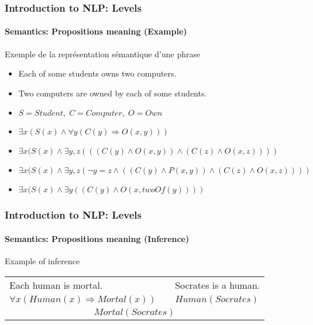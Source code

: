 \documentclass[xcolor=table]{beamer}
\begin{document}
\begin{frame}
\frametitle{Introduction to NLP: Levels}
\framesubtitle{Semantics: Propositions meaning (Example)}

\begin{exampleblock}{Exemple de la représentation sémantique d'une phrase}
	\begin{itemize}
		\item Each of some students owns two computers.
		\item Two computers are owned by each of some students.
		\item $S = Student, \; C = Computer, \; O = Own$
		\item $\exists x (S(x) \wedge \forall y ( C(y) \Rightarrow O(x, y)) )$ \textcolor{red}{\XBox}
		\item $\exists x (S(x) \wedge \exists y, z (( (C(y) \wedge O(x, y) ) \wedge (C(z) \wedge O(x, z) ) ))$ \textcolor{red}{\XBox}
		\item $\exists x (S(x) \wedge \exists y, z (\neg y = z \wedge ( (C(y) \wedge P(x, y) ) \wedge (C(z) \wedge O(x, z) ) ))$ \textcolor{green}{\CheckedBox}
		\item $\exists x (S(x) \wedge \exists y ((C(y) \wedge O(x, twoOf(y)) ))$ \textcolor{green}{\CheckedBox}
	\end{itemize}
\end{exampleblock}

\end{frame}

\begin{frame}
\frametitle{Introduction to NLP: Levels}
\framesubtitle{Semantics: Propositions meaning (Inference)}

\begin{exampleblock}{Example of inference}
	\centering
	\begin{tabular}{lll}
		Each human is mortal.  & & Socrates is a human. \\
		$\forall x (Human(x) \Rightarrow Mortal(x))$ && $Human(Socrates)$ \\
		\hline
		\multicolumn{3}{c}{$Mortal(Socrates)$}\\
	\end{tabular}
	
\end{exampleblock}

\end{frame}
\end{document}
